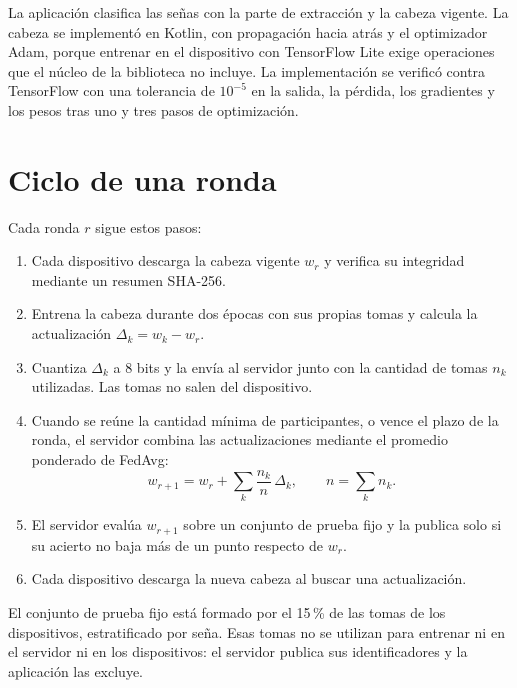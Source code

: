 La aplicación clasifica las señas con la parte de extracción y la cabeza vigente. La cabeza se implementó en Kotlin, con propagación hacia atrás y el optimizador Adam, porque entrenar en el dispositivo con TensorFlow Lite exige operaciones que el núcleo de la biblioteca no incluye. La implementación se verificó contra TensorFlow con una tolerancia de $10^{-5}$ en la salida, la pérdida, los gradientes y los pesos tras uno y tres pasos de optimización.


\section{Ciclo de una ronda}

Cada ronda $r$ sigue estos pasos:

\begin{enumerate}
    \item Cada dispositivo descarga la cabeza vigente $w_r$ y verifica su integridad mediante un resumen SHA-256.
    \item Entrena la cabeza durante dos épocas con sus propias tomas y calcula la actualización $\Delta_k = w_k - w_r$.
    \item Cuantiza $\Delta_k$ a 8 bits y la envía al servidor junto con la cantidad de tomas $n_k$ utilizadas. Las tomas no salen del dispositivo.
    \item Cuando se reúne la cantidad mínima de participantes, o vence el plazo de la ronda, el servidor combina las actualizaciones mediante el promedio ponderado de FedAvg:
    \begin{equation}
        w_{r+1} = w_r + \sum_{k} \frac{n_k}{n}\,\Delta_k, \qquad n = \sum_k n_k.
    \end{equation}
    \item El servidor evalúa $w_{r+1}$ sobre un conjunto de prueba fijo y la publica solo si su acierto no baja más de un punto respecto de $w_r$.
    \item Cada dispositivo descarga la nueva cabeza al buscar una actualización.
\end{enumerate}

El conjunto de prueba fijo está formado por el 15\,\% de las tomas de los dispositivos, estratificado por seña. Esas tomas no se utilizan para entrenar ni en el servidor ni en los dispositivos: el servidor publica sus identificadores y la aplicación las excluye.

